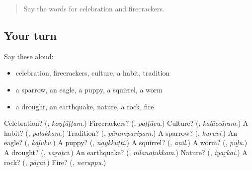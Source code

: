 \begin{quote}
Say the words for celebration and firecrackers.
\end{quote}

\subsection*{Your turn}
Say these aloud:

\begin{itemize}
\raggedright
  \item celebration, firecrackers, culture, a habit, tradition
  \item a sparrow, an eagle, a puppy, a squirrel, a worm
  \item a drought, an earthquake, nature, a rock, fire
\end{itemize}

\begin{tcolorbox}[breakable,colback=teal!4,colframe=teal!35!black,title={Before you move on}]
Celebration? (\textbf{}, \emph{koṇṭāṭṭam}.) Firecrackers? (\textbf{}, \emph{paṭṭācu}.) Culture? (\textbf{}, \emph{kalāccāram}.) A habit? (\textbf{}, \emph{paḻakkam}.) Tradition? (\textbf{}, \emph{pārampariyam}.) A sparrow? (\textbf{}, \emph{kuruvi}.) An eagle? (\textbf{}, \emph{kaḻuku}.) A puppy? (\textbf{}, \emph{nāykkuṭṭi}.) A squirrel? (\textbf{}, \emph{aṇil}.) A worm? (\textbf{}, \emph{puḻu}.) A drought? (\textbf{}, \emph{vaṟaṭci}.) An earthquake? (\textbf{}, \emph{nilanaṭukkam}.) Nature? (\textbf{}, \emph{iyaṟkai}.) A rock? (\textbf{}, \emph{pāṟai}.) Fire? (\textbf{}, \emph{neruppu}.)
\end{tcolorbox}
